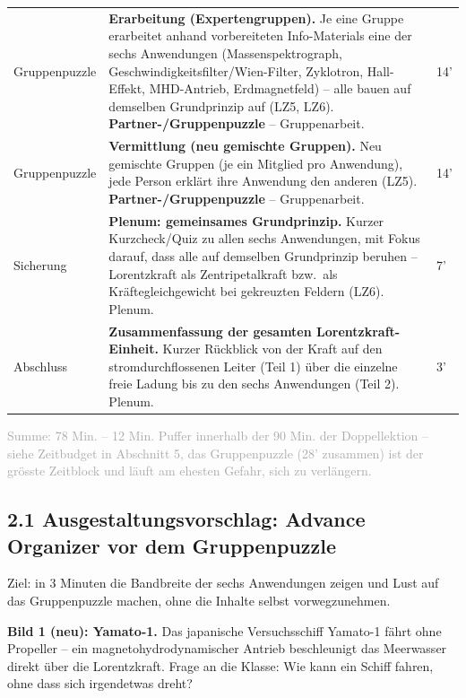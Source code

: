 \documentclass[11pt,a4paper]{article}
\newcommand{\Methode}[1]{{\small\color{groupteal}\textbf{#1}}}
\begin{document}
\begin{xltabular}{\textwidth}{@{}p{2.6cm}X p{1.2cm}@{}}
Gruppenpuzzle &
\textbf{Erarbeitung (Expertengruppen).} Je eine Gruppe erarbeitet
anhand vorbereiteten Info-Materials eine der sechs Anwendungen
(Massenspektrograph, Geschwindigkeitsfilter/Wien-Filter, Zyklotron,
Hall-Effekt, MHD-Antrieb, Erdmagnetfeld) -- alle bauen auf demselben
Grundprinzip auf (LZ5, LZ6). \Methode{Partner-/Gruppenpuzzle} --
Gruppenarbeit. &
14' \\[0.4em]

Gruppenpuzzle &
\textbf{Vermittlung (neu gemischte Gruppen).} Neu gemischte Gruppen (je
ein Mitglied pro Anwendung), jede Person erklärt ihre Anwendung den
anderen (LZ5). \Methode{Partner-/Gruppenpuzzle} -- Gruppenarbeit. &
14' \\[0.4em]

Sicherung &
\textbf{Plenum: gemeinsames Grundprinzip.} Kurzer Kurzcheck/Quiz zu allen
sechs Anwendungen, mit Fokus darauf, dass alle auf demselben
Grundprinzip beruhen -- Lorentzkraft als Zentripetalkraft bzw.\ als
Kräftegleichgewicht bei gekreuzten Feldern (LZ6). Plenum. &
7' \\[0.4em]

Abschluss &
\textbf{Zusammenfassung der gesamten Lorentzkraft-Einheit.} Kurzer
Rückblick von der Kraft auf den stromdurchflossenen Leiter (Teil 1) über
die einzelne freie Ladung bis zu den sechs Anwendungen (Teil 2). Plenum. &
3' \\

\bottomrule
\end{xltabular}

\textcolor{darkgray}{\small Summe: 78 Min. -- 12 Min. Puffer innerhalb der
90 Min. der Doppellektion -- siehe Zeitbudget in Abschnitt 5, das
Gruppenpuzzle (28' zusammen) ist der grösste Zeitblock und läuft am
ehesten Gefahr, sich zu verlängern.}

\subsection*{2.1 Ausgestaltungsvorschlag: Advance Organizer vor dem Gruppenpuzzle}

Ziel: in 3 Minuten die Bandbreite der sechs Anwendungen zeigen und Lust
auf das Gruppenpuzzle machen, ohne die Inhalte selbst vorwegzunehmen.

\textbf{Bild 1 (neu): Yamato-1.} Das japanische Versuchsschiff Yamato-1
fährt ohne Propeller -- ein magnetohydrodynamischer Antrieb beschleunigt
das Meerwasser direkt über die Lorentzkraft. Frage an die Klasse: \glqq
Wie kann ein Schiff fahren, ohne dass sich irgendetwas dreht?\grqq{}
\end{document}
